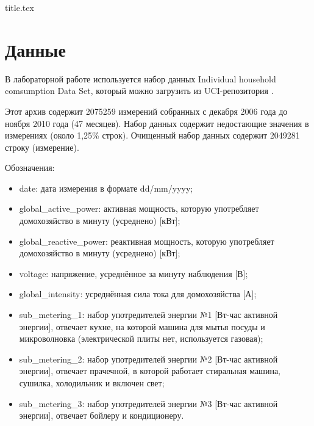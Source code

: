 

\usepackage{csvsimple}



{title.tex}

\clearpage



\clearpage
{}
\pagestyle{fancy}
\setcounter{page}{2}

\clearpage

\chapter{Данные}

В лабораторной работе используется набор данных Individual household comsumption Data Set, который можно загрузить из UCI-репозитория \cite{Lichman:2013}.


Этот архив содержит 2075259 измерений собранных с декабря 2006 года до ноября 2010 года (47 месяцев). Набор данных содержит недостающие значения в измерениях (около 1,25\% строк). Очищенный набор данных содержит 2049281 строку (измерение).


Обозначения:
\begin{itemize}
\item date: дата измерения в формате dd/mm/yyyy;
\item global\_active\_power: активная мощность, которую употребляет домохозяйство в минуту (усреднено) [кВт];
\item global\_reactive\_power: реактивная мощность, которую употребляет домохозяйство в минуту (усреднено) [кВт];
\item voltage: напряжение, усреднённое за минуту наблюдения [В];
\item global\_intensity: усреднённая сила тока для домохозяйства [А];
\item sub\_metering\_1: набор употредителей энергии №1 [Вт-час активной энергии], отвечает кухне, на которой машина для мытья посуды и микроволновка (электрической плиты нет, используется газовая);
\item sub\_metering\_2: набор употредителей энергии №2 [Вт-час активной энергии], отвечает прачечной, в которой работает стиральная машина, сушилка, холодильник и включен свет;
\item sub\_metering\_3: набор употредителей энергии №3 [Вт-час активной энергии], отвечает бойлеру и кондиционеру.
\end{itemize}


